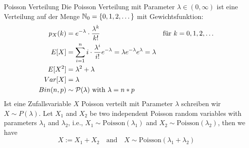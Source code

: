 \begin{definition}{Poisson Verteilung}
  Die Poisson Verteilung mit Parameter $\lambda \in (0, \infty)$ ist eine
  Verteilung auf der Menge $\mathbb{N}_0 = \{0, 1, 2, \dots\}$ mit Gewichtsfunktion:
  \begin{align*}
    p_X (k)   & = e^{-\lambda} \cdot \frac{\lambda^k}{k!}
              &                                                                                            & \text{für } k = 0, 1, 2, \dots \\
    E[X]      & = \sum_{i = 1}^n i \cdot \frac{\lambda^i}{i!} e^{-\lambda} = \lambda e^{-\lambda} e^\lambda = \lambda                                  \\
    E[X^2]    & = \lambda^2 + \lambda                                                                                                       \\
    Var[X]    & = \lambda                                                                                                                   \\
    Bin(n, p) & \sim \mathcal{P}(\lambda) \text{ with } \lambda = n * p
  \end{align*}
  Ist eine Zufallsvariable $X$ Poisson verteilt mit Parameter $\lambda$
  schreiben wir $X \sim P (\lambda)$.
  Let \( X_1 \) and \( X_2 \) be two independent Poisson random variables with parameters \( \lambda_1 \) and \( \lambda_2 \), i.e., \( X_1 \sim \text{Poisson}(\lambda_1) \) and \( X_2 \sim \text{Poisson}(\lambda_2) \), then we have
  \[ X := X_1 + X_2 \quad \text{and} \quad X \sim \text{Poisson}(\lambda_1 + \lambda_2) \]
\end{definition}
